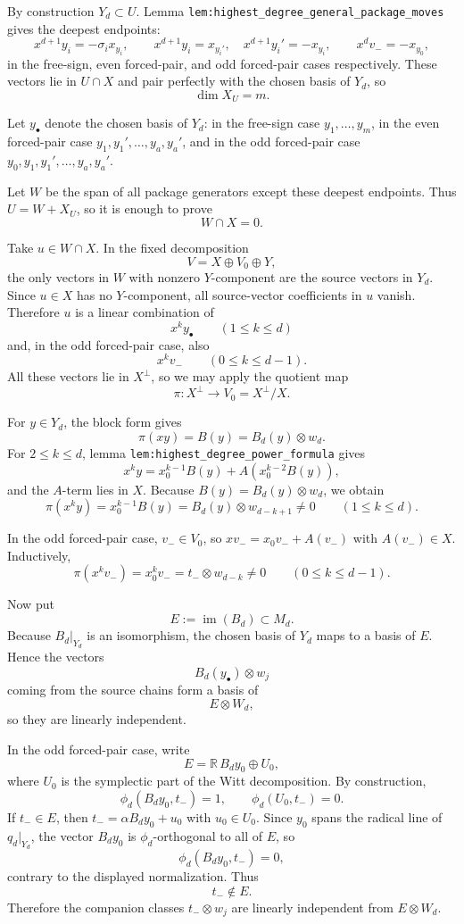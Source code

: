 \documentclass[
]{article}
\begin{document}
By construction \(Y_d\subset U\). Lemma
\texttt{lem:highest\_degree\_general\_package\_moves} gives the deepest
endpoints: \[
x^{d+1}y_i=-\sigma_i x_{y_i},\qquad
x^{d+1}y_i=x_{y_i'},\quad x^{d+1}y_i'=-x_{y_i},\qquad
x^d v_-=-x_{y_0},
\] in the free-sign, even forced-pair, and odd forced-pair cases
respectively. These vectors lie in \(U\cap X\) and pair perfectly with
the chosen basis of \(Y_d\), so \[
\dim X_U=m.
\]

Let \(y_\bullet\) denote the chosen basis of \(Y_d\): in the free-sign
case \(y_1,\dots,y_m\), in the even forced-pair case
\(y_1,y_1',\dots,y_a,y_a'\), and in the odd forced-pair case
\(y_0,y_1,y_1',\dots,y_a,y_a'\).

Let \(W\) be the span of all package generators except these deepest
endpoints. Thus \(U=W+X_U\), so it is enough to prove \[
W\cap X=0.
\]

Take \(u\in W\cap X\). In the fixed decomposition \[
V=X\oplus V_0\oplus Y,
\] the only vectors in \(W\) with nonzero \(Y\)-component are the source
vectors in \(Y_d\). Since \(u\in X\) has no \(Y\)-component, all
source-vector coefficients in \(u\) vanish. Therefore \(u\) is a linear
combination of \[
x^k y_\bullet\qquad (1\le k\le d)
\] and, in the odd forced-pair case, also \[
x^k v_-\qquad (0\le k\le d-1).
\] All these vectors lie in \(X^\perp\), so we may apply the quotient
map \[
\pi:X^\perp\longrightarrow V_0=X^\perp/X.
\]

For \(y\in Y_d\), the block form gives \[
\pi(xy)=B(y)=B_d(y)\otimes w_d.
\] For \(2\le k\le d\), lemma
\texttt{lem:highest\_degree\_power\_formula} gives \[
x^k y=x_0^{k-1}B(y)+A(x_0^{k-2}B(y)),
\] and the \(A\)-term lies in \(X\). Because \(B(y)=B_d(y)\otimes w_d\),
we obtain \[
\pi(x^k y)=x_0^{k-1}B(y)=B_d(y)\otimes w_{d-k+1}\neq 0
\qquad (1\le k\le d).
\]

In the odd forced-pair case, \(v_-\in V_0\), so \(xv_-=x_0v_-+A(v_-)\)
with \(A(v_-)\in X\). Inductively, \[
\pi(x^k v_-)=x_0^k v_-=t_-\otimes w_{d-k}\neq 0
\qquad (0\le k\le d-1).
\]

Now put \[
E:=\operatorname{im}(B_d)\subset M_d.
\] Because \(B_d|_{Y_d}\) is an isomorphism, the chosen basis of \(Y_d\)
maps to a basis of \(E\). Hence the vectors \[
B_d(y_\bullet)\otimes w_j
\] coming from the source chains form a basis of \[
E\otimes W_d,
\] so they are linearly independent.

In the odd forced-pair case, write \[
E=\mathbb R\,B_dy_0\oplus U_0,
\] where \(U_0\) is the symplectic part of the Witt decomposition. By
construction, \[
\phi_d(B_dy_0,t_-)=1,\qquad \phi_d(U_0,t_-)=0.
\] If \(t_-\in E\), then \(t_-=\alpha B_dy_0+u_0\) with \(u_0\in U_0\).
Since \(y_0\) spans the radical line of \(q_d|_{Y_d}\), the vector
\(B_dy_0\) is \(\phi_d\)-orthogonal to all of \(E\), so \[
\phi_d(B_dy_0,t_-)=0,
\] contrary to the displayed normalization. Thus \[
t_-\notin E.
\] Therefore the companion classes \(t_-\otimes w_j\) are linearly
independent from \(E\otimes W_d\).
\end{document}
